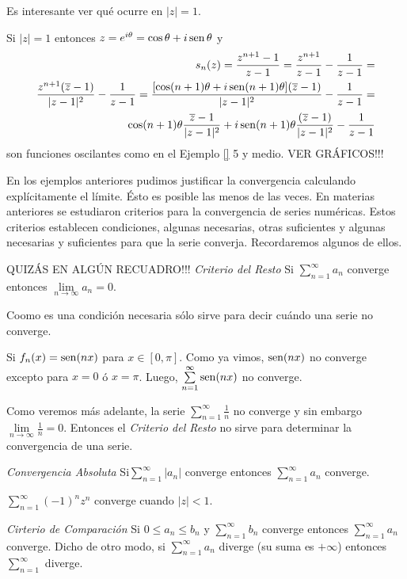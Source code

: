 Es interesante ver qué ocurre en $|z|=1$. 

Si $|z|=1$ entonces $z=e^{i\theta}=\cos \theta +i \operatorname{sen} \theta$ y 
\[
\begin{split}
s_n(z)=
\frac{z^{n+1}-1}{z-1}=
\frac{z^{n+1}}{z-1}-\frac{1}{z-1}=
\\
\frac{z^{n+1}(\overline z-1)}{|z-1|^2}-\frac{1}{z-1}=
\frac{ [\cos(n+1)\theta+i\operatorname{sen}(n+1)\theta](\overline z-1)}{|z-1|^2}-\frac{1}{z-1}=
\\
\cos(n+1)\theta \frac{\overline z-1}{|z-1|^2}+i \operatorname{sen}(n+1)\theta \frac{(\overline z-1)}{|z-1|^2}-\frac{1}{z-1}
\end{split}
\]
son funciones oscilantes como en el Ejemplo \ref{} 5 y medio. VER GRÁFICOS!!!

En los ejemplos anteriores pudimos justificar la convergencia calculando explícitamente el límite. 
Ésto es posible las menos de las veces. En materias anteriores se estudiaron criterios para la 
convergencia de series  numéricas. Estos criterios establecen condiciones, algunas necesarias, otras 
suficientes y algunas necesarias y suficientes para que la serie converja. Recordaremos algunos de ellos.

QUIZÁS EN ALGÚN RECUADRO!!!
\textit{Criterio del Resto}
Si  $\sum\limits_{n=1}^{\infty} a_n$ converge entonces $\lim\limits_{n \to \infty} a_n=0$.

Coomo es una condición  necesaria sólo sirve para decir cuándo una serie no converge.

\begin{ejemplo}
Si $f_n(x)= \operatorname{sen}(nx)$ para $x \in [0,\pi]$. 
Como ya vimos, $\operatorname{sen}(nx)$ no converge excepto para $x=0$ \'o $x=\pi$. 
Luego, $\sum\limits_{n=1}^{\infty} \operatorname{sen}(nx)$ no converge.
\end{ejemplo}

Como veremos más adelante, la serie $\sum\limits_{n=1}^{\infty}\frac{1}{n}$ no converge y sin embargo
$\lim\limits_{n \to \infty}\frac{1}{n}=0$. Entonces el \textit{Criterio del Resto} no sirve para determinar
la convergencia de una serie.

\textit{Convergencia Absoluta}
Si$\sum\limits_{n=1}^{\infty} |a_n|$ converge entonces $\sum\limits_{n=1}^{\infty} a_n$ converge.

\begin{ejemplo}
$\sum \limits_{n=1}^{\infty} (-1)^n z^n$ converge cuando $|z|<1$.
\end{ejemplo}

\textit{Cirterio de Comparación}
Si $0\leq a_n\leq b_n$ y $\sum\limits_{n=1}^{\infty} b_n$ converge entonces $\sum\limits_{n=1}^{\infty}a_n$ converge.
Dicho de otro modo, si $\sum\limits_{n=1}^{\infty} a_n$ diverge (su suma es $+\infty$) entonces 
$\sum\limits_{n=1}^{\infty}$ diverge.

